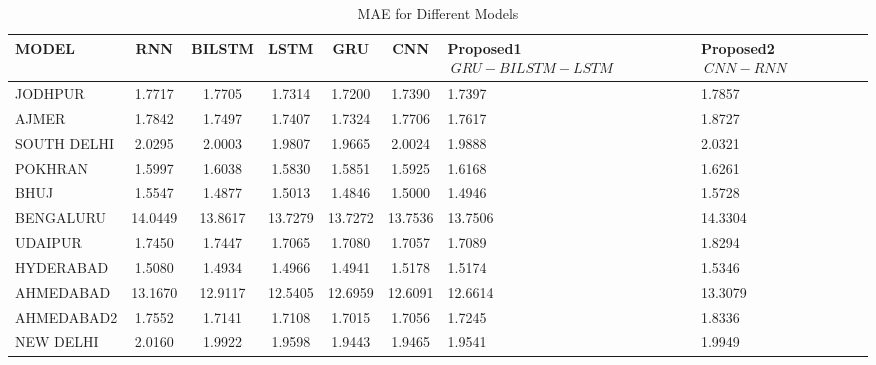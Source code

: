 \documentclass[a4paper,fleqn]{cas-sc}
\begin{document}
\begin{table}[!ht]
\centering
\caption{MAE for Different Models}
\begin{tabular}{|l|c|c|c|c|c|p{}|p{}|}
\hline
\textbf{MODEL} & \textbf{RNN} & \textbf{BILSTM} & \textbf{LSTM} & \textbf{GRU} & \textbf{CNN} &\textbf{Proposed1 \(\ GRU-BILSTM-LSTM \)\ } & \textbf{Proposed2 \(\ CNN-RNN\)\ } \\ \hline
JODHPUR & 1.7717 & 1.7705 & 1.7314 & 1.7200 & 1.7390 & 1.7397 & 1.7857 \\ \hline
AJMER & 1.7842 & 1.7497 & 1.7407 & 1.7324 & 1.7706 & 1.7617 & 1.8727 \\ \hline
SOUTH DELHI & 2.0295 & 2.0003 & 1.9807 & 1.9665 & 2.0024 & 1.9888 & 2.0321 \\ \hline
POKHRAN & 1.5997 & 1.6038 & 1.5830 & 1.5851 & 1.5925 & 1.6168 & 1.6261 \\ \hline
BHUJ & 1.5547 & 1.4877 & 1.5013 & 1.4846 & 1.5000 & 1.4946 & 1.5728 \\ \hline
BENGALURU & 14.0449 & 13.8617 & 13.7279 & 13.7272 & 13.7536 & 13.7506 & 14.3304 \\ \hline
UDAIPUR & 1.7450 & 1.7447 & 1.7065 & 1.7080 & 1.7057 & 1.7089 & 1.8294 \\ \hline
HYDERABAD & 1.5080 & 1.4934 & 1.4966 & 1.4941 & 1.5178 & 1.5174 & 1.5346 \\ \hline
AHMEDABAD & 13.1670 & 12.9117 & 12.5405 & 12.6959 & 12.6091 & 12.6614 & 13.3079 \\ \hline
AHMEDABAD2 & 1.7552 & 1.7141 & 1.7108 & 1.7015 & 1.7056 & 1.7245 & 1.8336 \\ \hline
NEW DELHI & 2.0160 & 1.9922 & 1.9598 & 1.9443 & 1.9465 & 1.9541 & 1.9949 \\ \hline
\end{tabular}
\end{table}
\end{document}
